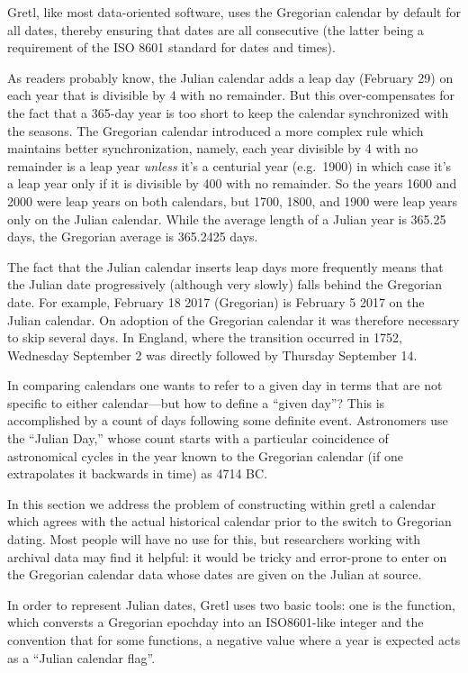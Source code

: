 Gretl, like most data-oriented software, uses the Gregorian calendar
by default for all dates, thereby ensuring that dates are all
consecutive (the latter being a requirement of the ISO 8601 standard
for dates and times).

As readers probably know, the Julian calendar adds a leap day
(February 29) on each year that is divisible by 4 with no
remainder. But this over-compensates for the fact that a 365-day year
is too short to keep the calendar synchronized with the seasons. The
Gregorian calendar introduced a more complex rule which maintains
better synchronization, namely, each year divisible by 4 with no
remainder is a leap year \textit{unless} it's a centurial year (e.g.\
1900) in which case it's a leap year only if it is divisible by 400
with no remainder.  So the years 1600 and 2000 were leap years on both
calendars, but 1700, 1800, and 1900 were leap years only on the Julian
calendar. While the average length of a Julian year is 365.25 days,
the Gregorian average is 365.2425 days. 

The fact that the Julian calendar inserts leap days more frequently
means that the Julian date progressively (although very slowly) falls
behind the Gregorian date. For example, February 18 2017 (Gregorian)
is February 5 2017 on the Julian calendar. On adoption of the
Gregorian calendar it was therefore necessary to skip several days. In
England, where the transition occurred in 1752, Wednesday September 2
was directly followed by Thursday September 14.

In comparing calendars one wants to refer to a given day in terms that
are not specific to either calendar---but how to define a ``given
day''? This is accomplished by a count of days following some definite
event. Astronomers use the ``Julian Day,'' whose count starts with a
particular coincidence of astronomical cycles in the year known to the
Gregorian calendar (if one extrapolates it backwards in time) as 4714
BC.

In this section we address the problem of constructing within gretl a
calendar which agrees with the actual historical calendar prior to
the switch to Gregorian dating. Most people will have no use for
this, but researchers working with archival data may find it helpful:
it would be tricky and error-prone to enter on the Gregorian calendar
data whose dates are given on the Julian at source.

In order to represent Julian dates, Gretl uses two basic tools: one is
the \cmd{juldate} function, which conversts a Gregorian epochday into
an ISO8601-like integer and the convention that for some functions,
a negative value where a year is expected acts as a ``Julian calendar
flag''.

